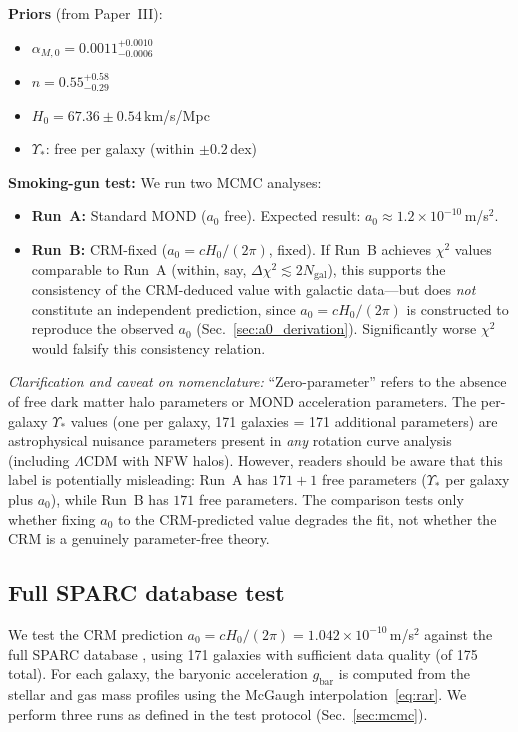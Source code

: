 \documentclass[aps,prd,twocolumn,superscriptaddress,nofootinbib]{revtex4-2}
\begin{document}
\textbf{Priors} (from Paper~III):
\begin{itemize}
\item $\alpha_{M,0} = 0.0011^{+0.0010}_{-0.0006}$
\item $n = 0.55^{+0.58}_{-0.29}$
\item $H_0 = 67.36 \pm 0.54$\,km/s/Mpc
\item $\Upsilon_*$: free per galaxy (within $\pm 0.2$\,dex)
\end{itemize}

\textbf{Smoking-gun test:} We run two MCMC analyses:
\begin{itemize}
\item \textbf{Run~A:} Standard MOND ($a_0$ free). Expected result: $a_0 \approx 1.2 \times 10^{-10}$\,m/s$^2$.
\item \textbf{Run~B:} CRM-fixed ($a_0 = cH_0/(2\pi)$, fixed). If Run~B achieves $\chi^2$ values comparable to Run~A (within, say, $\Delta\chi^2 \lesssim 2N_\mathrm{gal}$), this supports the consistency of the CRM-deduced value with galactic data---but does \emph{not} constitute an independent prediction, since $a_0 = cH_0/(2\pi)$ is constructed to reproduce the observed $a_0$ (Sec.~\ref{sec:a0_derivation}). Significantly worse $\chi^2$ would falsify this consistency relation.
\end{itemize}

\textit{Clarification and caveat on nomenclature:} ``Zero-parameter'' refers to the absence of free dark matter halo parameters or MOND acceleration parameters. The per-galaxy $\Upsilon_*$ values (one per galaxy, 171 galaxies = 171 additional parameters) are astrophysical nuisance parameters present in \textit{any} rotation curve analysis (including $\Lambda$CDM with NFW halos). However, readers should be aware that this label is potentially misleading: Run~A has $171 + 1$ free parameters ($\Upsilon_*$ per galaxy plus $a_0$), while Run~B has $171$ free parameters. The comparison tests only whether fixing $a_0$ to the CRM-predicted value degrades the fit, not whether the CRM is a genuinely parameter-free theory.

\subsection{Full SPARC database test}
\label{sec:sparc_results}

We test the CRM prediction $a_0 = cH_0/(2\pi) = 1.042 \times 10^{-10}$\,m/s$^2$ against the full SPARC database \cite{Lelli2016}, using 171 galaxies with sufficient data quality (of 175 total). For each galaxy, the baryonic acceleration $g_{\mathrm{bar}}$ is computed from the stellar and gas mass profiles using the McGaugh interpolation~\eqref{eq:rar}. We perform three runs as defined in the test protocol (Sec.~\ref{sec:mcmc}).
\end{document}
